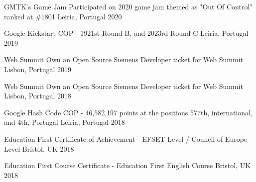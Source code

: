 



\begin{cvhonors}

  \cvhonor
    {GMTK’s Game Jam} %
    {Participated on 2020 game jam themed as "Out Of Control" ranked at \#1801} %
    {Leiria, Portugal} %
    {2020} %

  \cvhonor
    {Google Kickstart} %
    {COP - 1921st Round B, and 2023rd Round C} %
    {Leiria, Portugal} %
    {2019} %

  \cvhonor
    {Web Summit} %
    {Own an Open Source Siemens Developer ticket for Web Summit} %
    {Lisbon, Portugal} %
    {2019} %

  \cvhonor
    {Web Summit} %
    {Own an Open Source Siemens Developer ticket for Web Summit} %
    {Lisbon, Portugal} %
    {2018} %

  \cvhonor
    {Google Hash Code} %
    {COP - 46,582,197 points at the positions 577th, international, and 4th, Portugal} %
    {Leiria, Portugal} %
    {2018} %

  \cvhonor
    {Education First} %
    {Certificate of Achievement - EFSET Level / Council of Europe Level} %
    {Bristol, UK} %
    {2018} %

  \cvhonor
    {Education First} %
    {Course Certificate - Education First English Course} %
    {Bristol, UK} %
    {2018} %

\end{cvhonors}

